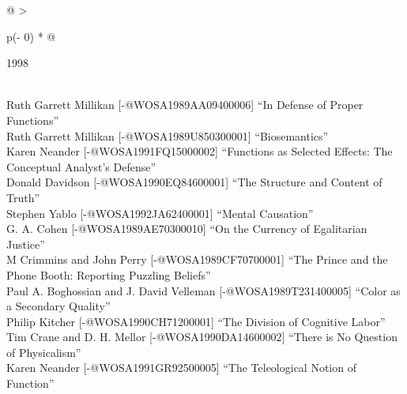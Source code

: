 \documentclass[
  10pt,
  letterpaper,
  DIV=11,
  numbers=noendperiod,
  twoside]{scrartcl}
\begin{document}
\begin{longtable}[]{@{}
  >{\raggedright\arraybackslash}p{(\columnwidth - 0\tabcolsep) * }@{}}

\caption{\label{tbl-top-ten-1989}Most cited articles published less than
ten years ago as of 1998.}

\tabularnewline

\toprule\noalign{}
\begin{minipage}[b]{\linewidth}\raggedright
1998
\end{minipage} \\
\midrule\noalign{}
\endhead
\bottomrule\noalign{}
\endlastfoot
Ruth Garrett Millikan {[}-@WOSA1989AA09400006{]} ``In Defense of Proper
Functions'' \\
Ruth Garrett Millikan {[}-@WOSA1989U850300001{]} ``Biosemantics'' \\
Karen Neander {[}-@WOSA1991FQ15000002{]} ``Functions as Selected
Effects: The Conceptual Analyst's Defense'' \\
Donald Davidson {[}-@WOSA1990EQ84600001{]} ``The Structure and Content
of Truth'' \\
Stephen Yablo {[}-@WOSA1992JA62400001{]} ``Mental Causation'' \\
G. A. Cohen {[}-@WOSA1989AE70300010{]} ``On the Currency of Egalitarian
Justice'' \\
M Crimmins and John Perry {[}-@WOSA1989CF70700001{]} ``The Prince and
the Phone Booth: Reporting Puzzling Beliefs'' \\
Paul A. Boghossian and J. David Velleman {[}-@WOSA1989T231400005{]}
``Color as a Secondary Quality'' \\
Philip Kitcher {[}-@WOSA1990CH71200001{]} ``The Division of Cognitive
Labor'' \\
Tim Crane and D. H. Mellor {[}-@WOSA1990DA14600002{]} ``There is No
Question of Physicalism'' \\
Karen Neander {[}-@WOSA1991GR92500005{]} ``The Teleological Notion of
Function'' \\

\end{longtable}
\end{document}
